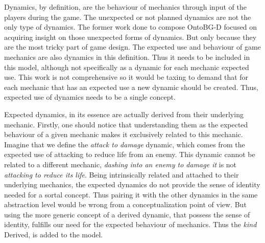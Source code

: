 Dynamics, by definition, are the behaviour of mechanics through input of the players during the game. The unexpected or not planned dynamics are not the only type of dynamics. The former work done to compose OntoBG-D focused on acquiring insight on those unexpected forms of dynamics. But only because they are the most tricky part of game design. The expected use and behaviour of game mechanics are also dynamics in this definition. Thus it needs to be included in this model, although not specifically as a dynamic for each mechanic expected use. This work is not comprehensive so it would be taxing to demand that for each mechanic that has an expected use a new dynamic should be created. Thus, expected use of dynamics needs to be a single concept.

Expected dynamics, in its essence are actually derived from their underlying mechanic. Firstly, one should notice that understanding them as the expected behaviour of a given mechanic makes it exclusively related to this mechanic. Imagine that we define the \textit{attack to damage} dynamic, which comes from the expected use of attacking to reduce life from an enemy. This dynamic cannot be related to a different mechanic, \textit{dashing into an enemy to damage it} is not \textit{attacking to reduce its life}. Being intrinsically related and attached to their underlying mechanics, the expected dynamics do not provide the sense of identity needed for a sortal concept. Thus pairing it with the other dynamics in the same abstraction level would be wrong from a conceptualization point of view. But using the more generic concept of a derived dynamic, that possess the sense of identity, fulfills our need for the expected behaviour of mechanics. Thus the \textit{kind} Derived, is added to the model. 

